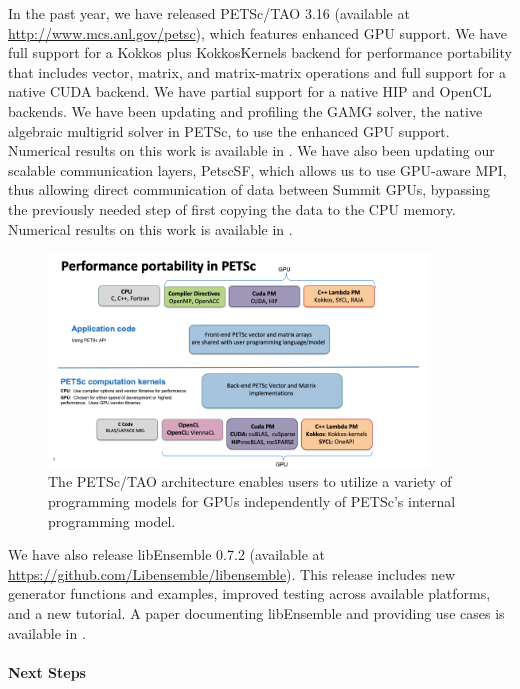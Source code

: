 In the past year, we have released PETSc/TAO 3.16 (available at \url{http://www.mcs.anl.gov/petsc}), which 
features enhanced GPU support.  We have full support for a Kokkos plus KokkosKernels backend for 
performance portability that includes vector, matrix, and matrix-matrix operations and full 
support for a native CUDA backend.  We have partial support for a native HIP and OpenCL 
backends.  We have been updating and profiling the GAMG solver, the native algebraic 
multigrid solver in PETSc, to use the enhanced GPU support.  Numerical results on
this work is available in \cite{mills2021toward}.  We have also been updating
our scalable communication layers, PetscSF, which allows us to use GPU-aware
MPI, thus allowing direct communication of data between Summit GPUs, bypassing 
the previously needed step of first copying the data to the CPU memory.  Numerical
results on this work is available in \cite{zhang2021petscsf}.

\begin{figure}
\centering
\includegraphics[trim = 0in .2in 1.7in .2in, clip, width=0.9\textwidth]{projects/2.3.3-MathLibs/2.3.3.06-PETSc-TAO/petsc_arch}
\caption{The PETSc/TAO architecture enables users to utilize a variety of programming 
models for GPUs independently of PETSc's internal programming model.}
\label{fig:petsc-tao-fig}
\end{figure}

We have also release libEnsemble 0.7.2 (available at \url{https://github.com/Libensemble/libensemble}).
This release includes new generator functions and examples, improved testing across available platforms,
and a new tutorial.  A paper documenting libEnsemble and providing use cases is available
in \cite{hudson2021libensemble}.

\paragraph{Next Steps}

